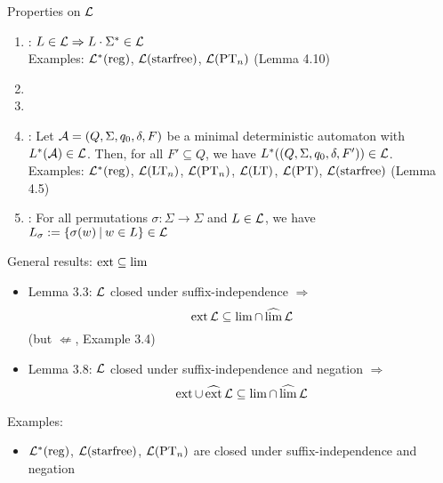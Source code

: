 \documentclass[
	handout,
	notheorems,noamsthm]{beamer}
\begin{document}
\begin{frame}[<+->]{Properties on $\mathcal{L}$}
\begin{enumerate}
\item {}: $L \in \mathcal{L} \Rightarrow L \cdot \Sigma^* \in \mathcal{L}$ \\
Examples: $\mathcal{L}^*(\textup{\textrm{reg}})$, $\mathcal{L}(\textup{\textrm{starfree}})$, $\mathcal{L}(\textup{\textrm{PT}}_n)$ (Lemma 4.10)
\item {}
\item {}
\item {}:
Let $\mathcal{A} = (Q,\Sigma,q_0,\delta,F)$ be a minimal deterministic automaton with $L^*(\mathcal{A}) \in \mathcal{L}$. Then, for all $F' \subseteq Q$, we have $L^*((Q,\Sigma,q_0,\delta,F')) \in \mathcal{L}$. \\
Examples: $\mathcal{L}^*(\textup{\textrm{reg}})$, $\mathcal{L}(\textup{\textrm{LT}}_n)$, $\mathcal{L}(\textup{\textrm{PT}}_n)$, $\mathcal{L}(\textup{\textrm{LT}})$, $\mathcal{L}(\textup{\textrm{PT}})$, $\mathcal{L}(\textup{\textrm{starfree}})$ (Lemma 4.5)
\item {}: For all permutations $\sigma \colon \Sigma \rightarrow \Sigma$ and $L \in \mathcal{L}$, we have $L_\sigma := \Set{\sigma(w)}{w \in L} \in \Lang$
\end{enumerate}
\end{frame}

\begin{frame}[<+->]{General results: $\operatorname{ext} \subseteq \lim$}
\begin{itemize}
\item Lemma 3.3: $\mathcal{L}$ closed under suffix-independence $\Rightarrow$
\[ \operatorname{ext} \mathcal{L} \subseteq \lim \cap \operatorname{\widehat{lim}} \mathcal{L} \]
(but $\not\Leftarrow$, Example 3.4)
\item Lemma 3.8: $\mathcal{L}$ closed under suffix-independence and negation $\Rightarrow$
\[ \operatorname{ext} \cup \operatorname{\widehat{ext}} \mathcal{L} \subseteq \lim \cap \operatorname{\widehat{lim}} \mathcal{L} \]
\end{itemize}
Examples:
\begin{itemize}
\item $\mathcal{L}^*(\textup{\textrm{reg}})$, $\mathcal{L}(\textup{\textrm{starfree}})$, $\mathcal{L}(\textup{\textrm{PT}}_n)$ are closed under suffix-independence and negation
\end{itemize}
\end{frame}
\end{document}
